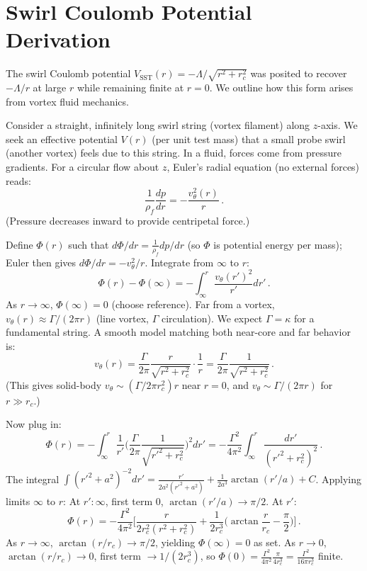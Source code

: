 \documentclass[reprint,aps,onecolumn,nofootinbib]{revtex4-2}
\begin{document}
	\section{Swirl Coulomb Potential Derivation}
	The swirl Coulomb potential $V_{\text{SST}}(r) = -\Lambda/\sqrt{r^2+r_c^2}$ was posited to recover $- \Lambda/r$ at large $r$ while remaining finite at $r=0$. We outline how this form arises from vortex fluid mechanics.

	Consider a straight, infinitely long swirl string (vortex filament) along $z$-axis. We seek an effective potential $V(r)$ (per unit test mass) that a small probe swirl (another vortex) feels due to this string. In a fluid, forces come from pressure gradients. For a circular flow about $z$, Euler’s radial equation (no external forces) reads:
	\[
		\frac{1}{\rho_f}\frac{dp}{dr} = -\frac{v_{\theta}^2(r)}{r}\,.
	\]
	(Pressure decreases inward to provide centripetal force.)

	Define $\Phi(r)$ such that $d\Phi/dr = \frac{1}{\rho_f}dp/dr$ (so $\Phi$ is potential energy per mass); Euler then gives $d\Phi/dr = -v_{\theta}^2/r$. Integrate from $\infty$ to $r$:
	\[
		\Phi(r) - \Phi(\infty) = -\int_{\infty}^{r} \frac{v_{\theta}(r')^2}{r'} dr'\,.
	\]
	As $r\to\infty$, $\Phi(\infty)=0$ (choose reference). Far from a vortex, $v_{\theta}(r) \approx \Gamma/(2\pi r)$ (line vortex, $\Gamma$ circulation). We expect $\Gamma = \kappa$ for a fundamental string. A smooth model matching both near-core and far behavior is:
	\[
		v_{\theta}(r) = \frac{\Gamma}{2\pi}\frac{r}{\sqrt{r^2+r_c^2}}\cdot\frac{1}{r} = \frac{\Gamma}{2\pi}\frac{1}{\sqrt{r^2+r_c^2}}\,.
	\]
	(This gives solid-body $v_{\theta}\sim (\Gamma/2\pi r_c^2)r$ near $r=0$, and $v_{\theta}\sim \Gamma/(2\pi r)$ for $r\gg r_c$.)

	Now plug in:
	\[
		\Phi(r) = -\int_{\infty}^{r} \frac{1}{r'}\Big(\frac{\Gamma}{2\pi}\frac{1}{\sqrt{r'^2+r_c^2}}\Big)^2 dr' = -\frac{\Gamma^2}{4\pi^2}\int_{\infty}^{r} \frac{dr'}{(r'^2+r_c^2)^2}\,.
	\]
	The integral $\int (r'^2+a^2)^{-2}dr' = \frac{r'}{2a^2(r'^2+a^2)} + \frac{1}{2a^3}\arctan(r'/a) + C$. Applying limits $\infty$ to $r$:
	At $r':\infty$, first term $0$, $\arctan(r'/a)\to\pi/2$. At $r'$:
	\[
		\Phi(r) = -\frac{\Gamma^2}{4\pi^2}\Big[\frac{r}{2r_c^2(r^2+r_c^2)} + \frac{1}{2r_c^3}\Big(\arctan\frac{r}{r_c} - \frac{\pi}{2}\Big)\Big]\,.
	\]
	As $r\to\infty$, $\arctan(r/r_c)\to\pi/2$, yielding $\Phi(\infty)=0$ as set. As $r\to0$, $\arctan(r/r_c)\to0$, first term $\to 1/(2r_c^3)$, so $\Phi(0) = \frac{\Gamma^2}{4\pi^2}\frac{\pi}{4r_c^3} = \frac{\Gamma^2}{16\pi r_c^3}$ finite.
\end{document}
